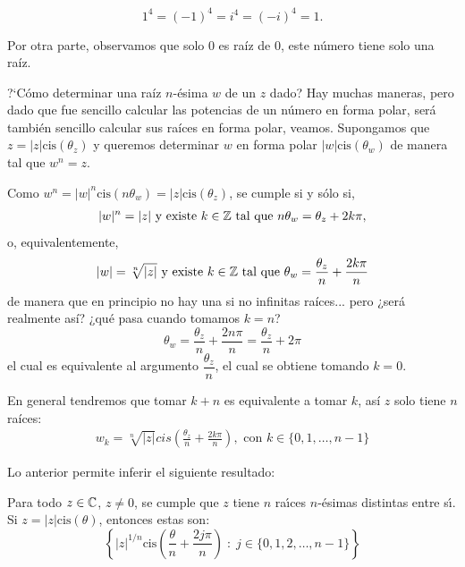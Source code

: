 $$ 1^4=(-1)^4=i^4=(-i)^4=1.$$

Por otra parte, observamos que solo 0 es raíz de 0, este número tiene solo una raíz.

?`C\'omo determinar una ra\'iz $n$-\'esima $w$ de un $z$ dado?
Hay muchas maneras, pero dado que fue sencillo calcular las potencias de un número en forma polar, será también sencillo calcular sus raíces en forma polar, veamos.
Supongamos que 
$z = |z| \mbox{cis}(\theta_z)$ y queremos determinar 
$w$ en forma polar $|w| \mbox{cis}(\theta_w)$ de manera tal que $w^n = z$.
 
Como $w^n = |w|^n \mbox{cis}(n \theta_w)=|z| \mbox{cis}(\theta_z)$,
se cumple si y s\'olo si,
\begin{align*}
    |w|^n=|z| \textrm{ y existe } k\in \mathbb{Z} \textrm{ tal que } n \theta_w=\theta_z +2k\pi,
\end{align*}
o, equivalentemente,
\begin{align*}
    |w|=\sqrt[n]{|z|} \textrm{ y existe } k\in \mathbb{Z} \textrm{ tal que } \theta_w=\frac{\theta_z}{n} +\frac{ 2 k  \pi}{n}
\end{align*}
de manera que en principio no hay una si no infinitas raíces... pero ¿será realmente así? ¿qué pasa cuando tomamos $k=n$?
$$\theta_w=\frac{\theta_z}{n} +\frac{ 2 n  \pi}{n}=\frac{\theta_z}{n}+2 \pi$$
el cual es equivalente al argumento $\dfrac{\theta_z}{n}$, el cual se obtiene tomando $k=0$.

En general tendremos que tomar $k+n$ es equivalente a tomar $k$, así $z$ solo tiene $n$ raíces:
\begin{align*}
    w_k=\sqrt[n]{|z|} cis \left(\frac{\theta_z}{n} +\frac{ 2 k  \pi}{n}\right), \textrm{ con } k\in\{0,1,\dots,n-1\}
\end{align*}

Lo anterior permite inferir el siguiente resultado:

\begin{lem}{}{}
    Para todo $z \in \mathbb{C}$, $z\neq 0$, se cumple que 
    $z$ tiene $n$ ra\'{\i}ces $n$-\'esimas distintas entre s\'{\i}. 
    Si $z = |z| \mbox{cis}(\theta)$, entonces estas son:
    \begin{equation}\label{raicesz}
        \left\{
            |z|^{1/n} \mbox{cis}\left(\frac{\theta}{n} + 
            \frac{2 j \pi}{n}\right)\;:\;
            j \in \{0,1,2,\ldots, n-1\}
        \right\}
    \end{equation}
\end{lem}



